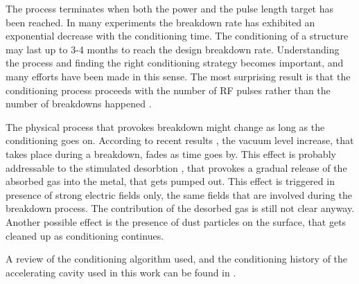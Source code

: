 The process terminates when both the power and the pulse length target has been reached. In many experiments the breakdown rate has exhibited an exponential decrease with the conditioning time. The conditioning of a structure may last up to 3-4 months to reach the design breakdown rate. Understanding the process and finding the right conditioning strategy becomes important, and many efforts have been made in this sense. The most surprising result is that the conditioning process proceeds with the number of RF pulses rather than the number of breakdowns happened \cite{Degiovanni:2065711}.

The physical process that provokes breakdown might change as long as the conditioning goes on. According to recent results \cite{Wuensch:583549}, the vacuum level increase, that takes place during a breakdown, fades as time goes by. This effect is probably addressable to the stimulated desorbtion \cite{soviet:1983}, that provokes a gradual release of the absorbed gas into the metal, that gets pumped out. This effect is triggered in presence of strong electric fields only, the same fields that are involved during the breakdown process. The contribution of the desorbed gas is still not clear anyway. Another possible effect is the presence of dust particles on the surface, that gets cleaned up as conditioning continues.

A review of the conditioning algorithm used, and the conditioning history of the accelerating cavity used in this work can be found in \cite{Degiovanni:1742280}.










